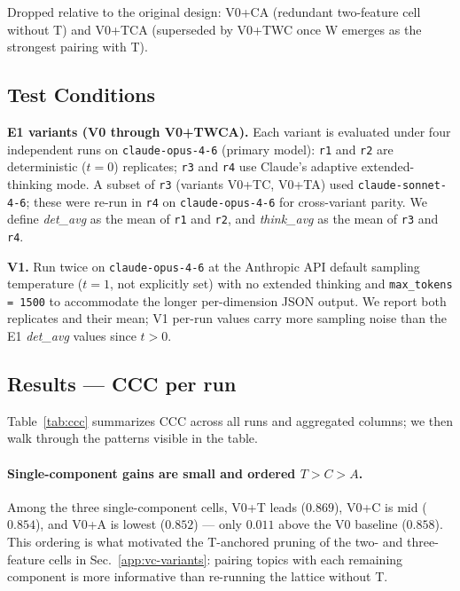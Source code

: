 Dropped relative to the original design: V0+CA (redundant two-feature cell
without T) and V0+TCA (superseded by V0+TWC once W emerges as the
strongest pairing with T).

\subsection{Test Conditions}
\label{app:vc-conditions}

\textbf{E1 variants (V0 through V0+TWCA).} Each variant is evaluated under
four independent runs on \texttt{claude-opus-4-6} (primary model):
\texttt{r1} and \texttt{r2} are deterministic ($t = 0$) replicates;
\texttt{r3} and \texttt{r4} use Claude's adaptive extended-thinking mode.
A subset of \texttt{r3} (variants V0+TC, V0+TA) used
\texttt{claude-sonnet-4-6}; these were re-run in \texttt{r4} on
\texttt{claude-opus-4-6} for cross-variant parity. We define
\emph{det\_avg} as the mean of \texttt{r1} and \texttt{r2}, and
\emph{think\_avg} as the mean of \texttt{r3} and \texttt{r4}.

\textbf{V1.} Run twice on \texttt{claude-opus-4-6} at the Anthropic API
default sampling temperature ($t = 1$, not explicitly set) with no
extended thinking and \texttt{max\_tokens = 1500} to accommodate the
longer per-dimension JSON output. We report both replicates and their
mean; V1 per-run values carry more sampling noise than the E1
\emph{det\_avg} values since $t > 0$.

\subsection{Results --- CCC per run}
\label{app:vc-ccc}

Table~\ref{tab:ccc} summarizes CCC across all runs and aggregated
columns; we then walk through the patterns visible in the table.

\paragraph{Single-component gains are small and ordered $T > C > A$.}
Among the three single-component cells, V0+T leads ($0.869$),
V0+C is mid ($0.854$), and V0+A is lowest ($0.852$) --- only
$0.011$ above the V0 baseline ($0.858$). This ordering is what
motivated the T-anchored pruning of the two- and three-feature cells
in Sec.~\ref{app:vc-variants}: pairing topics with each remaining
component is more informative than re-running the lattice without T.

